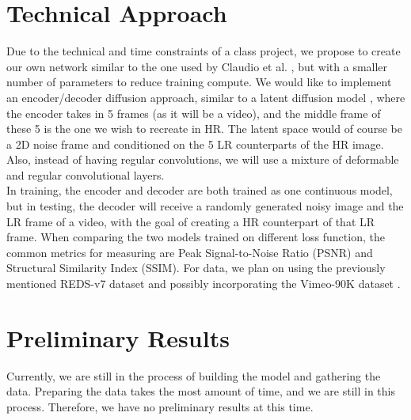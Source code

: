 \documentclass{article}
\begin{document}
\section{Technical Approach}

Due to the technical and time constraints of a class project, we propose to create our own network similar to the one used by Claudio et al. \cite{rota_enhancing_2023}, but with a smaller number of parameters to reduce training compute. We would like to implement an encoder/decoder diffusion approach, similar to a latent diffusion model \cite{rombach_high-resolution_2022}, where the encoder takes in 5 frames (as it will be a video), and the middle frame of these 5 is the one we wish to recreate in HR. The latent space would of course be a 2D noise frame and conditioned on the 5 LR counterparts of the HR image. Also, instead of having regular convolutions, we will use a mixture of deformable and regular convolutional layers. \\

In training, the encoder and decoder are both trained as one continuous model, but in testing, the decoder will receive a randomly generated noisy image and the LR frame of a video, with the goal of creating a HR counterpart of that LR frame. When comparing the two models trained on different loss function, the common metrics for measuring are Peak Signal-to-Noise Ratio (PSNR) and Structural Similarity Index (SSIM). For data, we plan on using the previously mentioned REDS-v7 dataset \cite{nah_ntire_2021} and possibly incorporating the Vimeo-90K dataset \cite{xue_video_2019}. \\

\section{Preliminary Results}

Currently, we are still in the process of building the model and gathering the data. Preparing the data takes the most amount of time, and we are still in this process. Therefore, we have no preliminary results at this time. \\
\\

\printbibliography %
\end{document}

